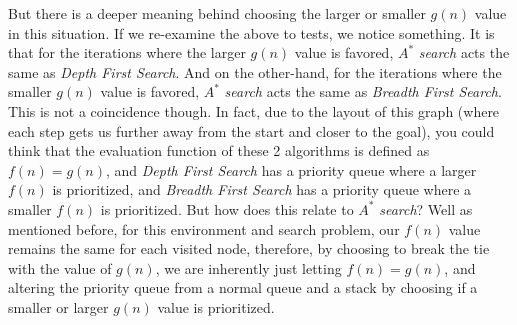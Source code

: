 But there is a deeper meaning behind choosing the larger or smaller $g(n)$ value in this situation. If we re-examine the above to tests, we notice something. It is that for the iterations where the larger $g(n)$ value is favored, $A^*$ \emph{search} acts the same as \emph{Depth First Search}. And on the other-hand, for the iterations where the smaller $g(n)$ value is favored, $A^*$ \emph{search} acts the same as \emph{Breadth First Search}. This is not a coincidence though. In fact, due to the layout of this graph (where each step gets us further away from the start and closer to the goal), you could think that the evaluation function of these 2 algorithms is defined as $f(n) = g(n)$, and \emph{Depth First Search} has a priority queue where a larger $f(n)$ is prioritized, and \emph{Breadth First Search} has a priority queue where a smaller $f(n)$ is prioritized. But how does this relate to $A^*$ \emph{search}? Well as mentioned before, for this environment and search problem, our $f(n)$ value remains the same for each visited node, therefore, by choosing to break the tie with the value of $g(n)$, we are inherently just letting $f(n) = g(n)$, and altering the priority queue from a normal queue and a stack by choosing if a smaller or larger $g(n)$ value is prioritized.

